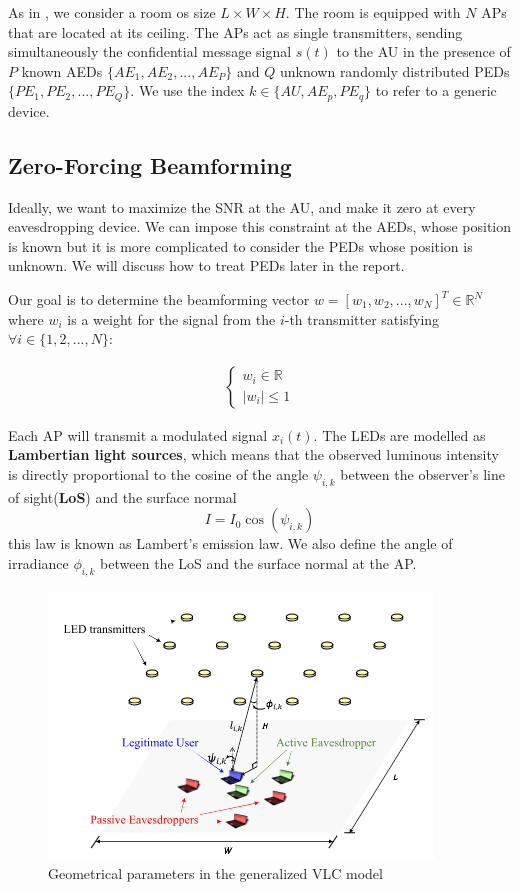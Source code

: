 \documentclass[a4paper,12pt,twoside]{article}
\begin{document}
	As in \cite{Edinburgh2020}, we consider a room os size $L \times W \times H$. The room is equipped with $N$ APs that are located at its ceiling. The APs act as single transmitters, sending simultaneously the confidential message signal $s(t)$ to the AU in the presence of $P$ known AEDs $\{ AE_1, AE_2, ..., AE_P \}$ and $Q$ unknown randomly distributed PEDs $\{ PE_1, PE_2, ..., PE_Q \}$. We use the index $k \in \{AU, AE_p, PE_q\}$ to refer to a generic device.
	
	\subsection{Zero-Forcing Beamforming}
	
	Ideally, we want to maximize the SNR at the AU, and make it zero at every eavesdropping device. We can impose this constraint at the AEDs, whose position is known but it is more complicated to consider the PEDs whose position is unknown. We will discuss how to treat PEDs later in the report.
	
	Our goal is to determine the beamforming vector $w = [w_1,w_2,...,w_N]^T \in \mathbb{R}^N$ where $w_i$ is a weight for the signal from the $i$-th transmitter satisfying $\forall i \in \{1,2,...,N\}$:
	
	\begin{align}
		\begin{cases}
			w_i \in \mathbb{R} \\
			|w_i| \leq 1
		\end{cases}
	\end{align}
	
	Each AP will transmit a modulated signal $x_i(t)$. The LEDs are modelled as \textbf{Lambertian light sources}, which means that the observed luminous intensity is directly proportional to the cosine of the angle  $\psi_{i,k}$ between the observer's line of sight(\textbf{LoS}) and the surface normal
	\begin{equation}
		I = I_0 \cos( \psi_{i,k})
	\end{equation}
	this law is known as Lambert's emission law. We also define the angle of irradiance $\phi_{i,k}$ between the LoS and the surface normal at the AP.
	
	\begin{figure}[h!]
		\centering
		\includegraphics[scale=0.8]{../geometry.PNG}
		\caption{Geometrical parameters in the generalized VLC model \cite{Oxford2021}}
	\end{figure}
	
\end{document}
